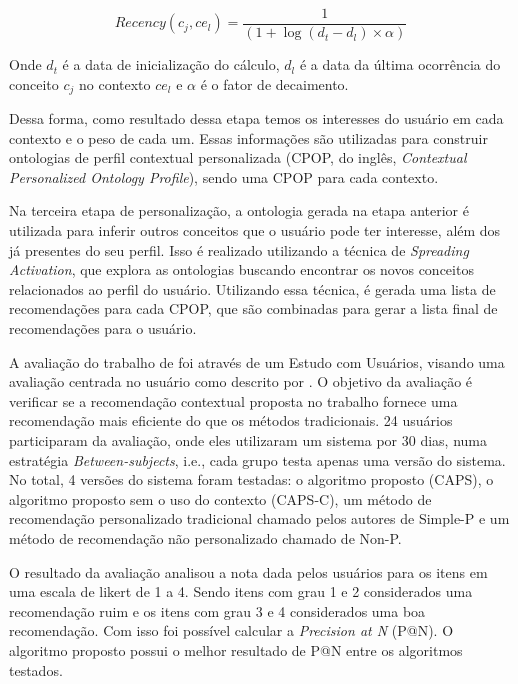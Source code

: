 \begin{equation}
  \label{eq:hawalah-recencia}
  Recency(c_j, ce_l) = \frac{1}{(1+\log(d_t - d_l) \times \alpha)}
\end{equation}

Onde $d_t$ é a data de inicialização do cálculo, $d_l$ é a data da última ocorrência do conceito $c_j$ no contexto
$ce_l$ e $\alpha$ é o fator de decaimento.

Dessa forma, como resultado dessa etapa temos os interesses do usuário em cada contexto e o peso de cada um. Essas
informações são utilizadas para construir ontologias de perfil contextual personalizada (CPOP, do inglês, \textit{Contextual
Personalized Ontology Profile}), sendo uma CPOP para cada contexto.

Na terceira etapa de personalização, a ontologia gerada na etapa anterior é utilizada para inferir outros conceitos que
o usuário pode ter interesse, além dos já presentes do seu perfil. Isso é realizado utilizando a técnica de \textit{Spreading
Activation}, que explora as ontologias buscando encontrar os novos conceitos relacionados ao perfil do usuário.
Utilizando essa técnica, é gerada uma lista de recomendações para cada CPOP, que são combinadas para gerar a lista
final de recomendações para o usuário.

A avaliação do trabalho de  foi através de um Estudo com Usuários, visando uma
avaliação centrada no usuário como descrito por . O objetivo da avaliação é verificar se
a recomendação contextual proposta no trabalho fornece uma recomendação mais eficiente do que os métodos tradicionais.
24 usuários participaram da avaliação, onde eles utilizaram um sistema por 30 dias, numa estratégia
\textit{Between-subjects}, i.e., cada grupo testa apenas uma versão do sistema. No total, 4 versões do sistema foram
testadas: o algoritmo proposto (CAPS), o algoritmo proposto sem o uso do contexto (CAPS-C), um método de recomendação
personalizado tradicional chamado pelos autores de Simple-P e um método de recomendação não personalizado chamado de Non-P.

O resultado da avaliação analisou a nota dada pelos usuários para os itens em uma escala de likert de 1 a 4. Sendo itens
com grau 1 e 2 considerados uma recomendação ruim e os itens com grau 3 e 4 considerados uma boa recomendação. Com isso
foi possível calcular a \textit{Precision at N} (P@N). O algoritmo proposto possui o melhor resultado de P@N entre os
algoritmos testados.


